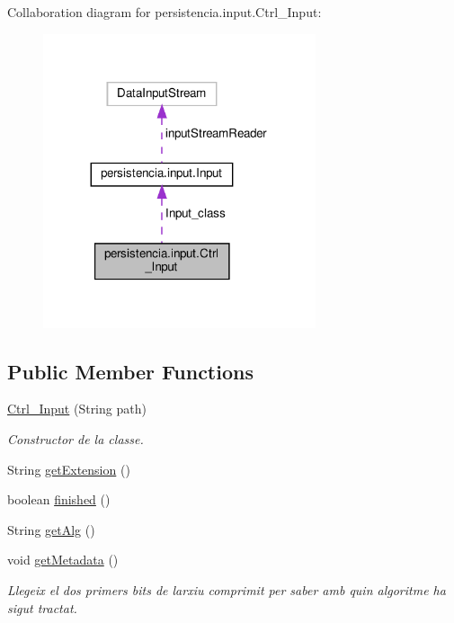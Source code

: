 Collaboration diagram for persistencia.\+input.\+Ctrl\+\_\+\+Input\+:\nopagebreak
\begin{figure}[H]
\begin{center}
\leavevmode
\includegraphics[width=227pt]{classpersistencia_1_1input_1_1Ctrl__Input__coll__graph}
\end{center}
\end{figure}
\subsection*{Public Member Functions}
\begin{DoxyCompactItemize}
\item 
\hyperlink{classpersistencia_1_1input_1_1Ctrl__Input_a00f3fa14d0329d6e4b9ddbe39ada1258}{Ctrl\+\_\+\+Input} (String path)
\begin{DoxyCompactList}\small\item\em Constructor de la classe. \end{DoxyCompactList}\item 
String \hyperlink{classpersistencia_1_1input_1_1Ctrl__Input_a46d569c2f3ceb0ab6cf9900708b3316a}{get\+Extension} ()
\item 
boolean \hyperlink{classpersistencia_1_1input_1_1Ctrl__Input_a5a94d207dce0fd592b5ac17f55154d4f}{finished} ()
\item 
String \hyperlink{classpersistencia_1_1input_1_1Ctrl__Input_aa69f79fb581f6d80c5a9609148794570}{get\+Alg} ()
\item 
\mbox{\label{classpersistencia_1_1input_1_1Ctrl__Input_a46e05fce164a6803820c02565c1769c8}} 
void \hyperlink{classpersistencia_1_1input_1_1Ctrl__Input_a46e05fce164a6803820c02565c1769c8}{get\+Metadata} ()
\begin{DoxyCompactList}\small\item\em Llegeix el dos primers bits de l\textquotesingle{}arxiu comprimit per saber amb quin algoritme ha sigut tractat. \end{DoxyCompactList}\end{DoxyCompactItemize}
